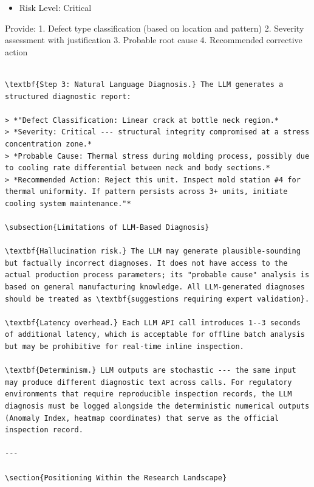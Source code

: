 \documentclass[12pt,a4paper,oneside]{report}
\begin{document}
\begin{itemize}
  \item Risk Level: Critical
\end{itemize}
Provide:
1. Defect type classification (based on location and pattern)
2. Severity assessment with justification
3. Probable root cause
4. Recommended corrective action
\begin{verbatim}

\textbf{Step 3: Natural Language Diagnosis.} The LLM generates a structured diagnostic report:

> *"Defect Classification: Linear crack at bottle neck region.*
> *Severity: Critical --- structural integrity compromised at a stress concentration zone.*
> *Probable Cause: Thermal stress during molding process, possibly due to cooling rate differential between neck and body sections.*
> *Recommended Action: Reject this unit. Inspect mold station #4 for thermal uniformity. If pattern persists across 3+ units, initiate cooling system maintenance."*

\subsection{Limitations of LLM-Based Diagnosis}

\textbf{Hallucination risk.} The LLM may generate plausible-sounding but factually incorrect diagnoses. It does not have access to the actual production process parameters; its "probable cause" analysis is based on general manufacturing knowledge. All LLM-generated diagnoses should be treated as \textbf{suggestions requiring expert validation}.

\textbf{Latency overhead.} Each LLM API call introduces 1--3 seconds of additional latency, which is acceptable for offline batch analysis but may be prohibitive for real-time inline inspection.

\textbf{Determinism.} LLM outputs are stochastic --- the same input may produce different diagnostic text across calls. For regulatory environments that require reproducible inspection records, the LLM diagnosis must be logged alongside the deterministic numerical outputs (Anomaly Index, heatmap coordinates) that serve as the official inspection record.

---

\section{Positioning Within the Research Landscape}


\end{verbatim}
\end{document}
